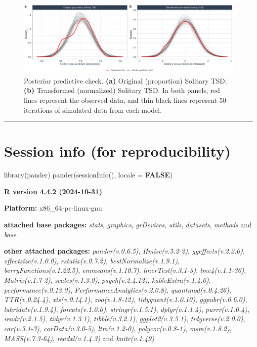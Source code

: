\documentclass[
  bookmarksnumbered]{article}
\newenvironment{Shaded}{\begin{snugshade}}{\end{snugshade}}
\newcommand{\AttributeTok}[1]{\textcolor[rgb]{0.80,0.80,0.80}{#1}}
\newcommand{\ConstantTok}[1]{\textcolor[rgb]{0.86,0.64,0.64}{\textbf{#1}}}
\newcommand{\FunctionTok}[1]{\textcolor[rgb]{0.94,0.94,0.56}{#1}}
\newcommand{\NormalTok}[1]{\textcolor[rgb]{0.80,0.80,0.80}{#1}}
\begin{document}
\begin{figure}
\centering
\includegraphics{Sexual_Desire_Arousal_V2_files/figure-latex/ppc-m2a-1.pdf}
\caption{\label{fig:ppc-m2a}Posterior predictive check. \textbf{(a)} Original (proportion) Solitary TSD; \textbf{(b)} Transformed (normalized) Solitary TSD. In both panels, red lines represent the observed data, and thin black lines represent 50 iterations of simulated data from each model.}
\end{figure}

\begin{center}\rule{0.5\linewidth}{0.5pt}\end{center}

\section{Session info (for reproducibility)}\label{session}

\begin{Shaded}
\begin{Highlighting}[]
\FunctionTok{library}\NormalTok{(pander)}
\FunctionTok{pander}\NormalTok{(}\FunctionTok{sessionInfo}\NormalTok{(), }\AttributeTok{locale =} \ConstantTok{FALSE}\NormalTok{)}
\end{Highlighting}
\end{Shaded}

\textbf{R version 4.4.2 (2024-10-31)}

\textbf{Platform:} x86\_64-pc-linux-gnu

\textbf{attached base packages:}
\emph{stats}, \emph{graphics}, \emph{grDevices}, \emph{utils}, \emph{datasets}, \emph{methods} and \emph{base}

\textbf{other attached packages:}
\emph{pander(v.0.6.5)}, \emph{Hmisc(v.5.2-2)}, \emph{ggeffects(v.2.2.0)}, \emph{effectsize(v.1.0.0)}, \emph{rstatix(v.0.7.2)}, \emph{bestNormalize(v.1.9.1)}, \emph{berryFunctions(v.1.22.5)}, \emph{emmeans(v.1.10.7)}, \emph{lmerTest(v.3.1-3)}, \emph{lme4(v.1.1-36)}, \emph{Matrix(v.1.7-2)}, \emph{scales(v.1.3.0)}, \emph{psych(v.2.4.12)}, \emph{kableExtra(v.1.4.0)}, \emph{performance(v.0.13.0)}, \emph{PerformanceAnalytics(v.2.0.8)}, \emph{quantmod(v.0.4.26)}, \emph{TTR(v.0.24.4)}, \emph{xts(v.0.14.1)}, \emph{zoo(v.1.8-12)}, \emph{tidyquant(v.1.0.10)}, \emph{ggpubr(v.0.6.0)}, \emph{lubridate(v.1.9.4)}, \emph{forcats(v.1.0.0)}, \emph{stringr(v.1.5.1)}, \emph{dplyr(v.1.1.4)}, \emph{purrr(v.1.0.4)}, \emph{readr(v.2.1.5)}, \emph{tidyr(v.1.3.1)}, \emph{tibble(v.3.2.1)}, \emph{ggplot2(v.3.5.1)}, \emph{tidyverse(v.2.0.0)}, \emph{car(v.3.1-3)}, \emph{carData(v.3.0-5)}, \emph{ltm(v.1.2-0)}, \emph{polycor(v.0.8-1)}, \emph{msm(v.1.8.2)}, \emph{MASS(v.7.3-64)}, \emph{readxl(v.1.4.3)} and \emph{knitr(v.1.49)}
\end{document}

